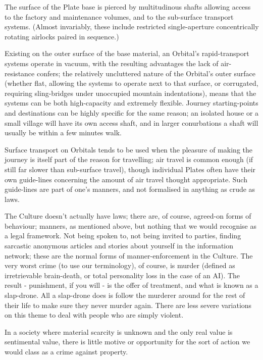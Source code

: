 The surface of the Plate base is pierced by multitudinous shafts allowing access to the factory and maintenance volumes, and to the sub-surface transport systems. (Almost invariably, these include restricted single-aperture concentrically rotating airlocks paired in sequence.)

Existing on the outer surface of the base material, an Orbital's rapid-transport systems operate in vacuum, with the resulting advantages the lack of air-resistance confers; the relatively uncluttered nature of the Orbital's outer surface (whether flat, allowing the systems to operate next to that surface, or corrugated, requiring sling-bridges under unoccupied mountain indentations), means that the systems can be both high-capacity and extremely flexible. Journey starting-points and destinations can be highly specific for the same reason; an isolated house or a small village will have its own access shaft, and in larger conurbations a shaft will usually be within a few minutes walk.

Surface transport on Orbitals tends to be used when the pleasure of making the journey is itself part of the reason for travelling; air travel is common enough (if still far slower than sub-surface travel), though individual Plates often have their own guide-lines concerning the amount of air travel thought appropriate. Such guide-lines are part of one's manners, and not formalised in anything as crude as laws.

The Culture doesn't actually have laws; there are, of course, agreed-on forms of behaviour; manners, as mentioned above, but nothing that we would recognise as a legal framework. Not being spoken to, not being invited to parties, finding sarcastic anonymous articles and stories about yourself in the information network; these are the normal forms of manner-enforcement in the Culture. The very worst crime (to use our terminology), of course, is murder (defined as irretrievable brain-death, or total personality loss in the case of an AI). The result - punishment, if you will - is the offer of treatment, and what is known as a slap-drone. All a slap-drone does is follow the murderer around for the rest of their life to make sure they never murder again. There are less severe variations on this theme to deal with people who are simply violent.

In a society where material scarcity is unknown and the only real value is sentimental value, there is little motive or opportunity for the sort of action we would class as a crime against property.

